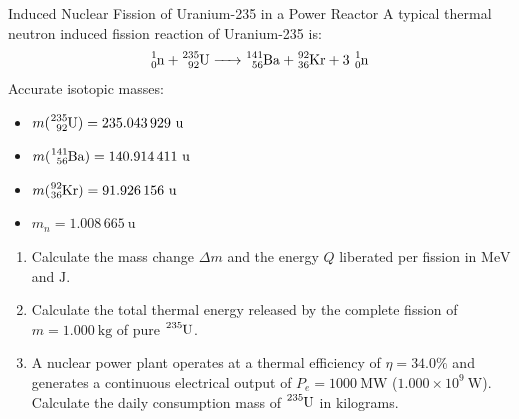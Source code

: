\begin{exercise}{Induced Nuclear Fission of Uranium-235 in a Power Reactor}
A typical thermal neutron induced fission reaction of Uranium-235 is:
\[
\ce{^{1}_{0}n + ^{235}_{92}U -> ^{141}_{56}Ba + ^{92}_{36}Kr + 3\,^{1}_{0}n}
\]
Accurate isotopic masses:
\begin{itemize}[itemsep=1pt]
  \item $m(\ce{^{235}_{92}U}) = 235.043\,929\ \mathrm{u}$
  \item $m(\ce{^{141}_{56}Ba}) = 140.914\,411\ \mathrm{u}$
  \item $m(\ce{^{92}_{36}Kr}) = 91.926\,156\ \mathrm{u}$
  \item $m_n = 1.008\,665\ \mathrm{u}$
\end{itemize}
\begin{enumerate}[leftmargin=1.5em,itemsep=2pt]
  \item Calculate the mass change $\Delta m$ and the energy $Q$ liberated per fission in $\mathrm{MeV}$ and $\mathrm{J}$.
  \item Calculate the total thermal energy released by the complete fission of $m = 1.000\ \mathrm{kg}$ of pure $\ce{^{235}U}$.
  \item A nuclear power plant operates at a thermal efficiency of $\eta = 34.0\%$ and generates a continuous electrical output of $P_e = 1000\ \mathrm{MW}$ ($1.000 \times 10^9\ \mathrm{W}$). Calculate the daily consumption mass of $\ce{^{235}U}$ in kilograms.
\end{enumerate}
\end{exercise}

\begin{tabletworkspace}[5.0cm]
\end{tabletworkspace}

